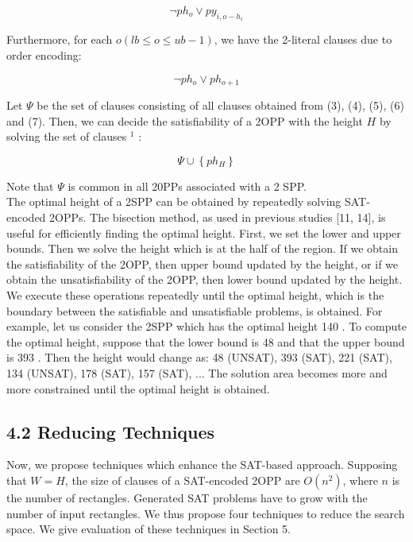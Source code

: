 \documentclass[10pt]{article}
\begin{document}
\begin{equation*}
\neg p h_{o} \vee p y_{i, o-h_{i}} \tag{6}
\end{equation*}


Furthermore, for each $o(l b \leq o \leq u b-1)$, we have the 2-literal clauses due to order encoding:


\begin{equation*}
\neg p h_{o} \vee p h_{o+1} \tag{7}
\end{equation*}


Let $\Psi$ be the set of clauses consisting of all clauses obtained from (3), (4), (5), (6) and (7). Then, we can decide the satisfiability of a 2OPP with the height $H$ by solving the set of clauses ${ }^{1}$ :


\begin{equation*}
\Psi \cup\left\{p h_{H}\right\} \tag{8}
\end{equation*}


Note that $\Psi$ is common in all 20PPs associated with a 2 SPP.\\[0pt]
The optimal height of a 2SPP can be obtained by repeatedly solving SAT-encoded 2OPPs. The bisection method, as used in previous studies [11, 14], is useful for efficiently finding the optimal height. First, we set the lower and upper bounds. Then we solve the height which is at the half of the region. If we obtain the satisfiability of the 2OPP, then upper bound updated by the height, or if we obtain the unsatisfiability of the 2OPP, then lower bound updated by the height. We execute these operations repeatedly until the optimal height, which is the boundary between the satisfiable and unsatisfiable problems, is obtained. For example, let us consider the 2SPP which has the optimal height 140 . To compute the optimal height, suppose that the lower bound is 48 and that the upper bound is 393 . Then the height would change as: 48 (UNSAT), 393 (SAT), 221 (SAT), 134 (UNSAT), 178 (SAT), 157 (SAT), ... The solution area becomes more and more constrained until the optimal height is obtained.

\subsection*{4.2 Reducing Techniques}
Now, we propose techniques which enhance the SAT-based approach. Supposing that $W=H$, the size of clauses of a SAT-encoded 2OPP are $O\left(n^{2}\right)$, where $n$ is the number of rectangles. Generated SAT problems have to grow with the number of input rectangles. We thus propose four techniques to reduce the search space. We give evaluation of these techniques in Section 5.
\end{document}
